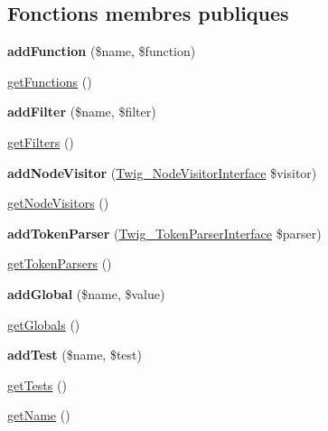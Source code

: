 \subsection*{Fonctions membres publiques}
\begin{DoxyCompactItemize}
\item 
{\bfseries add\+Function} (\$name, \$function)\hypertarget{class_twig___extension___staging_aa1024a293b0cd6f0978050e4546d2b35}{}\label{class_twig___extension___staging_aa1024a293b0cd6f0978050e4546d2b35}

\item 
\hyperlink{class_twig___extension___staging_a131c2522f07821f77cd1d038c216031b}{get\+Functions} ()
\item 
{\bfseries add\+Filter} (\$name, \$filter)\hypertarget{class_twig___extension___staging_a02ad22fc2cdd381d7f7dc0808d496b1b}{}\label{class_twig___extension___staging_a02ad22fc2cdd381d7f7dc0808d496b1b}

\item 
\hyperlink{class_twig___extension___staging_a428d91319fc73d3038784cf5436936b6}{get\+Filters} ()
\item 
{\bfseries add\+Node\+Visitor} (\hyperlink{interface_twig___node_visitor_interface}{Twig\+\_\+\+Node\+Visitor\+Interface} \$visitor)\hypertarget{class_twig___extension___staging_adc294d7c409f47d2c26847601897c6db}{}\label{class_twig___extension___staging_adc294d7c409f47d2c26847601897c6db}

\item 
\hyperlink{class_twig___extension___staging_aec02093179d390d22ae4083f23a1d74a}{get\+Node\+Visitors} ()
\item 
{\bfseries add\+Token\+Parser} (\hyperlink{interface_twig___token_parser_interface}{Twig\+\_\+\+Token\+Parser\+Interface} \$parser)\hypertarget{class_twig___extension___staging_a8f805d29eac2b8ce1da513e9390952f3}{}\label{class_twig___extension___staging_a8f805d29eac2b8ce1da513e9390952f3}

\item 
\hyperlink{class_twig___extension___staging_a8fd35903c3d01c0f0078f59d142eb063}{get\+Token\+Parsers} ()
\item 
{\bfseries add\+Global} (\$name, \$value)\hypertarget{class_twig___extension___staging_ad967754d97f0c9ccd329246fa9255808}{}\label{class_twig___extension___staging_ad967754d97f0c9ccd329246fa9255808}

\item 
\hyperlink{class_twig___extension___staging_ae3a26252ce6efe503698085a7ed69dad}{get\+Globals} ()
\item 
{\bfseries add\+Test} (\$name, \$test)\hypertarget{class_twig___extension___staging_a4c647ddc962509158de8a6a4b404ca54}{}\label{class_twig___extension___staging_a4c647ddc962509158de8a6a4b404ca54}

\item 
\hyperlink{class_twig___extension___staging_a7e247dd31cc8d37a6c97353a062a0080}{get\+Tests} ()
\item 
\hyperlink{class_twig___extension___staging_a3d0963e68bb313b163a73f2803c64600}{get\+Name} ()
\end{DoxyCompactItemize}
